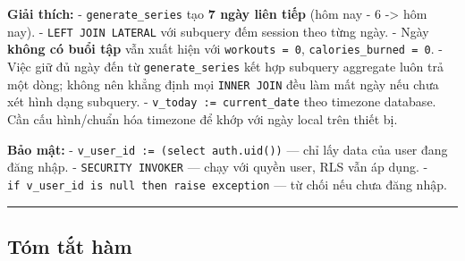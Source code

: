 \documentclass[12pt,a4paper]{article}
\newenvironment{Shaded}{%
  \VerbatimEnvironment
  \begin{quote}\small\ttfamily
}{%
  \end{quote}%
}
\begin{document}
\begin{Shaded}
\begin{Highlighting}[]
\OperatorTok{{-}}  \NormalTok{) } 
 
   \NormalTok{(}\OperatorTok{*}\NormalTok{):}  \NormalTok{, }\NormalTok{(}\NormalTok{) }
   
  \OperatorTok{=}\OperatorTok{=} \NormalTok{:}
 

\end{Highlighting}
\end{Shaded}

\textbf{Giải thích:} - \texttt{generate\_series} tạo \textbf{7 ngày liên
tiếp} (hôm nay - 6 -\textgreater{} hôm nay). -
\texttt{LEFT\ JOIN\ LATERAL} với subquery đếm session theo từng ngày. -
Ngày \textbf{không có buổi tập} vẫn xuất hiện với
\texttt{workouts\ =\ 0}, \texttt{calories\_burned\ =\ 0}. - Việc giữ đủ
ngày đến từ \texttt{generate\_series} kết hợp subquery aggregate luôn
trả một dòng; không nên khẳng định mọi \texttt{INNER\ JOIN} đều làm mất
ngày nếu chưa xét hình dạng subquery. -
\texttt{v\_today\ :=\ current\_date} theo timezone database. Cần cấu
hình/chuẩn hóa timezone để khớp với ngày local trên thiết bị.

\textbf{Bảo mật:} - \texttt{v\_user\_id\ :=\ (select\ auth.uid())} ---
chỉ lấy data của user đang đăng nhập. - \texttt{SECURITY\ INVOKER} ---
chạy với quyền user, RLS vẫn áp dụng. -
\texttt{if\ v\_user\_id\ is\ null\ then\ raise\ exception} --- từ chối
nếu chưa đăng nhập.

\begin{center}\rule{0.5\linewidth}{0.5pt}\end{center}

\subsection{Tóm tắt hàm}\label{tuxf3m-tux1eaft-huxe0m}
\end{document}
